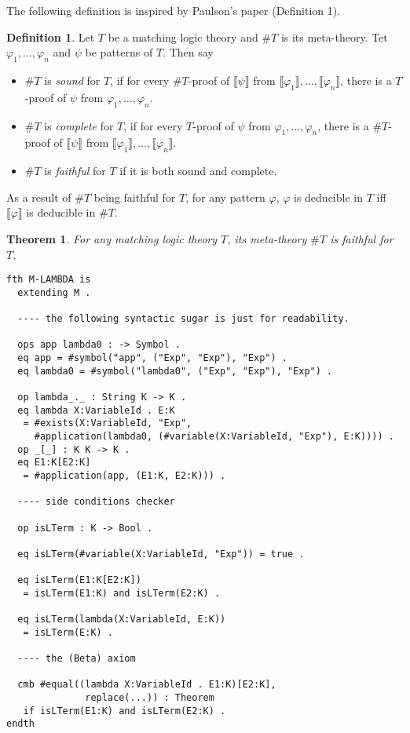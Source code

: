 \documentclass[UTF8]{article}
\newcounter{thmcounter}
\theoremstyle{plain}
\newtheorem{theorem}[thmcounter]{Theorem}
\theoremstyle{definition}
\newtheorem{definition}[thmcounter]{Definition}
\theoremstyle{remark}
\newcommand{\Bracket}[1]
    {\llbracket#1\rrbracket}
\begin{document}
The following definition is inspired by Paulson's paper (Definition 1). 
\begin{definition}
	Let $T$ be a matching logic theory and $\#T$ is its meta-theory. 
	Tet	$\varphi_1,\dots,\varphi_n$ and $\psi$ be patterns of $T$.	
	Then say
	\begin{itemize}
		\item $\#T$ is \emph{sound} for $T$, if for every $\#T$-proof of 
		$\Bracket{\psi}$ from 
		$\Bracket{\varphi_1}, \dots, 
		\Bracket{\varphi_n}$, there is a 
		$T$-proof of $\psi$ from 
		$\varphi_1,\dots,\varphi_n$.
		\item $\#T$ is \emph{complete} for $T$, if for every $T$-proof of 
		$\psi$ from $\varphi_1,\dots,\varphi_n$, there is a $\#T$-proof of 
		$\Bracket{\psi}$ from 
		$\Bracket{\varphi_1}, \dots, 
		\Bracket{\varphi_n}$.
		\item $\#T$ is \emph{faithful} for $T$ if it is both sound and complete.
	\end{itemize}
    As a result of $\#T$ being faithful for $T$, for any pattern $\varphi$, 
    $\varphi$ is deducible in $T$ iff $\Bracket{\varphi}$ is 
    deducible in $\#T$.
\end{definition}
\begin{theorem}
	For any matching logic theory $T$, its meta-theory $\#T$ is faithful for $T$.
\end{theorem}


{\color{blue}
\begin{Verbatim}[fontsize=\small]
fth M-LAMBDA is
  extending M .
  
  ---- the following syntactic sugar is just for readability. 

  ops app lambda0 : -> Symbol .
  eq app = #symbol("app", ("Exp", "Exp"), "Exp") .
  eq lambda0 = #symbol("lambda0", ("Exp", "Exp"), "Exp") .
  
  op lambda_._ : String K -> K .
  eq lambda X:VariableId . E:K
   = #exists(X:VariableId, "Exp", 
     #application(lambda0, (#variable(X:VariableId, "Exp"), E:K)))) .
  op _[_] : K K -> K .
  eq E1:K[E2:K] 
   = #application(app, (E1:K, E2:K))) .
   
  ---- side conditions checker
  
  op isLTerm : K -> Bool .

  eq isLTerm(#variable(X:VariableId, "Exp")) = true .
  
  eq isLTerm(E1:K[E2:K])
   = isLTerm(E1:K) and isLTerm(E2:K) .
   
  eq isLTerm(lambda(X:VariableId, E:K))
   = isLTerm(E:K) .
  
  ---- the (Beta) axiom

  cmb #equal((lambda X:VariableId . E1:K)[E2:K],
              replace(...)) : Theorem
   if isLTerm(E1:K) and isLTerm(E2:K) .
endth
\end{Verbatim}
}
\end{document}
